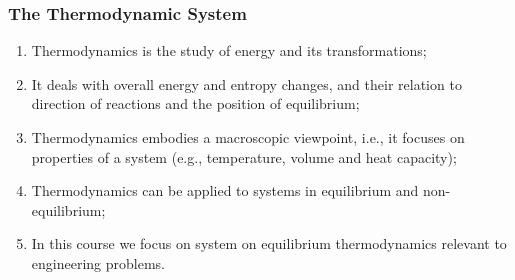 \documentclass[10pt,compress,handout,ignorenonframetext]{beamer}
\begin{document}
\begin{frame}
 \frametitle{The Thermodynamic System}
  \begin{enumerate}[(1)]\scriptsize
   \item <1-> Thermodynamics is the study of energy and its transformations;
   \item <2-> It deals with overall energy and entropy changes, and their relation to direction of reactions and the position of equilibrium;
   \item <3-> Thermodynamics embodies a macroscopic viewpoint, i.e., it focuses on properties of a system (e.g., temperature, volume and heat capacity);
   \item <4-> Thermodynamics can be applied to systems in equilibrium and non-equilibrium;
   \item <5-> In this course we focus on system on equilibrium thermodynamics relevant to engineering problems.   
  \end{enumerate}
\end{frame}
\end{document}
